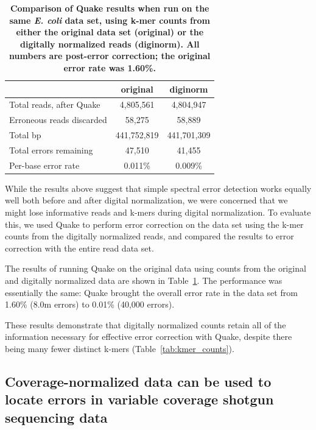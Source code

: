 \documentclass{article}
\begin{document}
\begin{table}
\centering
\begin{tabular}{|l|c|c|}
\hline
                                 & original    & diginorm \\
\hline
Total reads, after Quake         & 4,805,561   & 4,804,947 \\
Erroneous reads discarded        & 58,275      & 58,889 \\
Total bp                         & 441,752,819 & 441,701,309 \\
Total errors remaining           & 47,510      & 41,455 \\
Per-base error rate              & 0.011\%     & 0.009\% \\
\hline
\end{tabular}

\caption{{\bf Comparison of Quake results when run on the same {\em
      E. coli} data set, using k-mer counts from either the original
    data set (original) or the digitally normalized reads
    (diginorm).  All numbers are post-error correction; the original
    error rate was 1.60\%.}}

\label{tab:quake_ecoli}
\end{table}

While the results above suggest that simple spectral error detection
works equally well both before and after digital normalization, we
were concerned that we might lose informative reads and k-mers during
digital normalization.  To evaluate this, we used Quake to perform
error correction on the data set using the k-mer counts from the
digitally normalized reads, and compared the results to error
correction with the entire read data set.

The results of running Quake on the original data using counts from
the original and digitally normalized data are shown in
Table~\ref{tab:quake_ecoli}.  The performance was essentially the
same: Quake brought the overall error rate in the data set from 1.60\%
(8.0m errors) to 0.01\% (40,000 errors).

These results demonstrate that digitally normalized counts retain all
of the information necessary for effective error correction with
Quake, despite there being many fewer distinct k-mers
(Table~\ref{tab:kmer_counts}).

\subsection{Coverage-normalized data can be used to locate errors in variable
coverage shotgun sequencing data}
\end{document}
